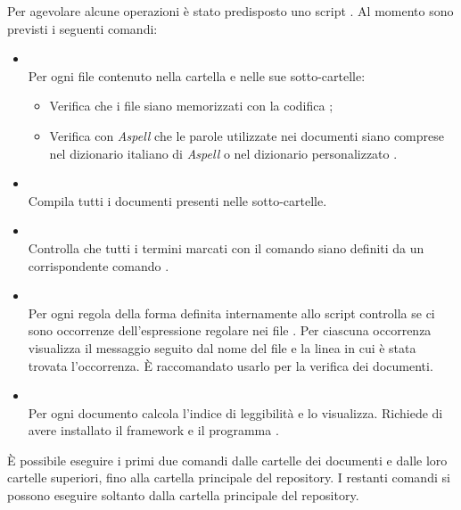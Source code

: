 Per agevolare alcune operazioni è stato predisposto uno script . Al momento sono previsti i seguenti comandi:
\begin{itemize}

\item \textbf{} \\
Per ogni file  contenuto nella cartella e nelle sue sotto-cartelle:
\begin{itemize}
	\item Verifica che i file siano memorizzati con la codifica ;
	\item Verifica con \emph{Aspell} che le parole utilizzate nei documenti siano comprese nel dizionario italiano di \emph{Aspell} o nel dizionario personalizzato .
\end{itemize}
	
\item \textbf{} \\
Compila tutti i documenti presenti nelle sotto-cartelle.

\item \textbf{} \\
Controlla che tutti i termini marcati con il comando \code{\\glossario\{\dots\}} siano definiti da un corrispondente comando .

\item \textbf{} \\
Per ogni regola della forma  definita internamente allo script controlla se ci sono occorrenze dell'espressione regolare  nei file . Per ciascuna occorrenza visualizza il messaggio  seguito dal nome del file e la linea in cui è stata trovata l'occorrenza. È raccomandato usarlo per la verifica dei documenti.

\item \textbf{} \\
Per ogni documento  calcola l'indice di leggibilità  e lo visualizza. Richiede di avere installato il framework  e il programma .

\end{itemize}

È possibile eseguire i primi due comandi dalle cartelle dei documenti e dalle loro cartelle superiori, fino alla cartella principale del repository. I restanti comandi si possono eseguire soltanto dalla cartella principale del repository.

